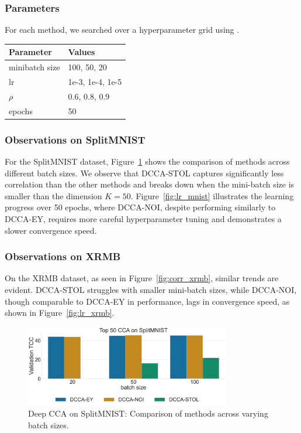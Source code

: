 \subsubsection{Parameters} For each method, we searched over a hyperparameter grid using \citet{wandb}.

\begin{table}[h!]
    \centering
    \begin{tabular}{|l|l|}
        \hline Parameter           & Values           \\
        \hline minibatch size      & 100, 50, 20      \\
        \hline lr                  & 1e-3, 1e-4, 1e-5 \\
        \hline $\rho$\footnotemark & 0.6, 0.8, 0.9    \\
        \hline epochs              & 50               \\
        \hline
    \end{tabular}
    \label{tab:hyperparams}
\end{table}

\subsubsection{Observations on SplitMNIST}
For the SplitMNIST dataset, Figure~\ref{fig:corr_mnist} shows the comparison of methods across different batch sizes.
We observe that DCCA-STOL captures significantly less correlation than the other methods and breaks down when the mini-batch size is smaller than the dimension $K=50$.
Figure~\ref{fig:lr_mnist} illustrates the learning progress over 50 epochs, where DCCA-NOI, despite performing similarly to DCCA-EY, requires more careful hyperparameter tuning and demonstrates a slower convergence speed.

\subsubsection{Observations on XRMB}
On the XRMB dataset, as seen in Figure~\ref{fig:corr_xrmb}, similar trends are evident.
DCCA-STOL struggles with smaller mini-batch sizes, while DCCA-NOI, though comparable to DCCA-EY in performance, lags in convergence speed, as shown in Figure~\ref{fig:lr_xrmb}.

\begin{figure}
    \centering
    \includegraphics[width=0.8\textwidth]{figures/DCCA/SplitMNIST_models_different_batch_sizes}
    \caption{Deep CCA on SplitMNIST: Comparison of methods across varying batch sizes.}
    \label{fig:corr_mnist}
\end{figure}

